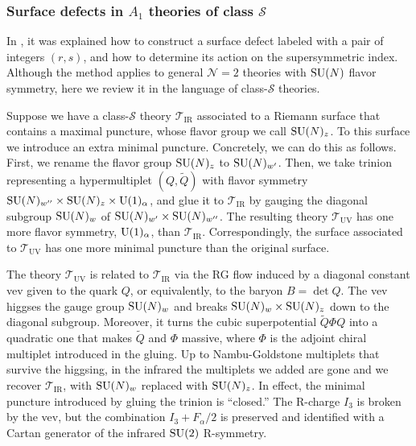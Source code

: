 \subsubsection{Surface defects in $A_{1}$ theories of class $\mathcal{S}$}

In \cite{Gaiotto:2012xa}, it was explained how to construct
a surface defect labeled with a pair of integers $(r,s)$, and how
to determine its action on the supersymmetric index. Although the
method applies to general $\mathcal{N}=2$ theories with $\mathrm{SU}(N)$
flavor symmetry, here we review it in the language of class-$\mathcal{S}$
theories. 

Suppose we have a class-$\mathcal{S}$ theory $\mathcal{T}_{\mathrm{IR}}$
associated to a Riemann surface that contains a maximal puncture,
whose flavor group we call $\mathrm{SU}(N)_{z}$. To this surface we introduce
an extra minimal puncture. Concretely, we can do this as follows.
First, we rename the flavor group $\mathrm{SU}(N)_{z}$ to $\mathrm{SU}(N)_{w'}$. Then,
we take trinion representing a hypermultiplet $(Q,\tilde{Q})$ with
flavor symmetry $\mathrm{SU}(N)_{w''} \times \mathrm{SU}(N)_{z}\times \mathrm{U}(1)_{\alpha}$,
and glue it to $\mathcal{T}_{\mathrm{IR}}$ by gauging the diagonal
subgroup $\mathrm{SU}(N)_{w}$ of $\mathrm{SU}(N)_{w'}\times \mathrm{SU}(N)_{w''}$. The resulting
theory $\mathcal{T}_{\mathrm{UV}}$ has one more flavor symmetry,
$\mathrm{U}(1)_{\alpha}$, than $\mathcal{T}_{\mathrm{IR}}$. Correspondingly,
the surface associated to $\mathcal{T}_{\mathrm{UV}}$ has one more
minimal puncture than the original surface.

The theory $\mathcal{T}_{\mathrm{UV}}$ is related to $\mathcal{T}_{\mathrm{IR}}$
via the RG flow induced by a diagonal constant vev given to the quark
$Q$, or equivalently, to the baryon $B=\det Q$. The vev higgses
the gauge group $\mathrm{SU}(N)_{w}$ and breaks $\mathrm{SU}(N)_{w} \times \mathrm{SU}(N)_{z}$
down to the diagonal subgroup. Moreover, it turns the cubic superpotential
$\tilde{Q} \Phi Q$ into a quadratic one that makes $\tilde{Q}$ and
$\Phi$ massive, where $\Phi$ is the adjoint chiral multiplet introduced
in the gluing. Up to Nambu-Goldstone multiplets that survive the higgsing,
in the infrared the multiplets we added are gone and we recover $\mathcal{T}_{\mathrm{IR}}$,
with $\mathrm{SU}(N)_{w}$ replaced with $\mathrm{SU}(N)_{z}$. In effect, the minimal
puncture introduced by gluing the trinion is ``closed.'' The R-charge
$I_{3}$ is broken by the vev, but the combination $I_{3}+F_{\alpha}/2$
is preserved and identified with a Cartan generator of the infrared
$\mathrm{SU}(2)$ R-symmetry.

